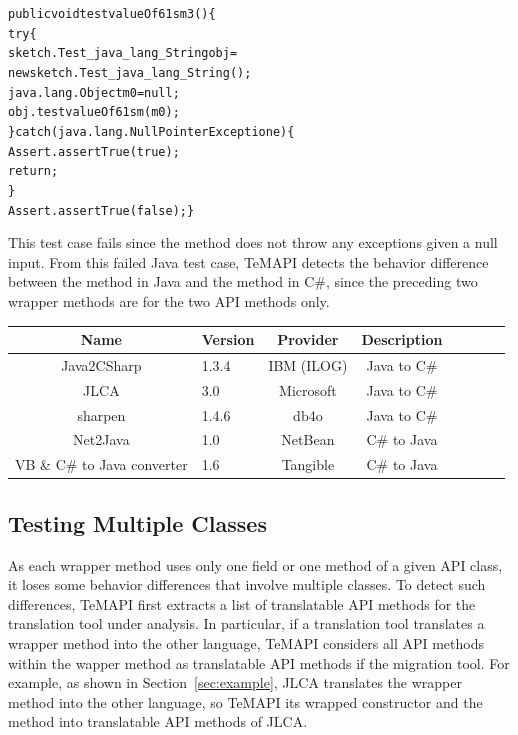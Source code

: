 \begin{CodeOut}\vspace*{-1ex}
\begin{alltt}
 public void testvalueOf61sm3()\{
   try\{
     sketch.Test_java_lang_String obj =
           new sketch.Test_java_lang_String();
     java.lang.Object m0 = null;
     obj.testvalueOf61sm(m0);
   \}catch(java.lang.NullPointerException e)\{
     Assert.assertTrue(true);
     return;
   \}
   Assert.assertTrue(false); \}
\end{alltt}
\end{CodeOut}\vspace*{-1ex}

This test case fails since the  method does not throw any exceptions given a null input.
From this failed Java test case, TeMAPI detects the behavior difference between the  method in Java and the  method in C\#, since the preceding two wrapper methods are for the two API methods only.
\begin{table}[t]
\centering
\begin{SmallOut}
\begin {tabular} {|c|l|c|c|c|c|c|c|}
 \hline
\textbf{Name}& \textbf{Version}& \textbf{Provider} &\textbf{Description}\\
\hline
Java2CSharp  &  1.3.4 & IBM (ILOG) & Java to C\# \\
\hline
JLCA         &  3.0   & Microsoft  & Java to C\# \\
\hline
sharpen      &  1.4.6 & db4o       & Java to C\# \\
\hline
Net2Java     &  1.0   & NetBean    &  C\# to Java\\
\hline
VB \& C\# to Java converter    &  1.6   & Tangible   &  C\# to Java\\
\hline
\end{tabular}\vspace*{-2ex}
 \label{table:subjects}
\end{SmallOut}\vspace*{-2ex}
\end{table}
\subsection{Testing Multiple Classes}
\label{sec:approach:sequence}
As each wrapper method uses only one field or one method of a given API class, it loses some behavior differences that involve multiple classes. To detect such differences, TeMAPI first extracts a list of translatable API methods for the translation tool under analysis. In particular, if a translation tool translates a wrapper method into the other language, TeMAPI considers all API methods within the wapper method as translatable API methods if the migration tool. For example, as shown in Section~\ref{sec:example}, JLCA translates the  wrapper method into the other language, so TeMAPI its wrapped  constructor and the  method into translatable API methods of JLCA.

